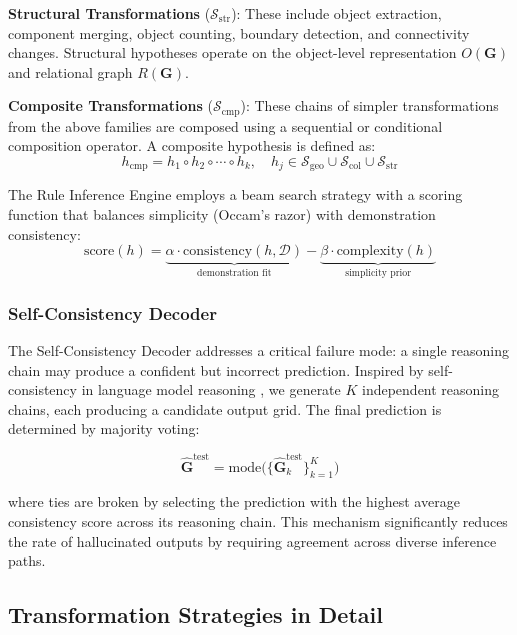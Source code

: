 \documentclass[conference,10pt,letterpaper]{IEEEtran}
\begin{document}
\textbf{Structural Transformations} ($\mathcal{S}_{\text{str}}$): These include object extraction, component merging, object counting, boundary detection, and connectivity changes. Structural hypotheses operate on the object-level representation $O(\mathbf{G})$ and relational graph $R(\mathbf{G})$.

\textbf{Composite Transformations} ($\mathcal{S}_{\text{cmp}}$): These chains of simpler transformations from the above families are composed using a sequential or conditional composition operator. A composite hypothesis is defined as:
\begin{equation}
    h_{\text{cmp}} = h_1 \circ h_2 \circ \cdots \circ h_k, \quad h_j \in \mathcal{S}_{\text{geo}} \cup \mathcal{S}_{\text{col}} \cup \mathcal{S}_{\text{str}}
\end{equation}

The Rule Inference Engine employs a beam search strategy with a scoring function that balances simplicity (Occam's razor) with demonstration consistency:
\begin{equation}
    \text{score}(h) = \underbrace{\alpha \cdot \text{consistency}(h, \mathcal{D})}_{\text{demonstration fit}} - \underbrace{\beta \cdot \text{complexity}(h)}_{\text{simplicity prior}}
\end{equation}

\subsubsection{Self-Consistency Decoder}

The Self-Consistency Decoder addresses a critical failure mode: a single reasoning chain may produce a confident but incorrect prediction. Inspired by self-consistency in language model reasoning \cite{wang2022selfconsistency}, we generate $K$ independent reasoning chains, each producing a candidate output grid. The final prediction is determined by majority voting:

\begin{equation}
    \hat{\mathbf{G}}^{\text{test}} = \text{mode}\bigl(\{\hat{\mathbf{G}}^{\text{test}}_k\}_{k=1}^{K}\bigr)
\end{equation}

where ties are broken by selecting the prediction with the highest average consistency score across its reasoning chain. This mechanism significantly reduces the rate of hallucinated outputs by requiring agreement across diverse inference paths.

\subsection{Transformation Strategies in Detail}
\end{document}
